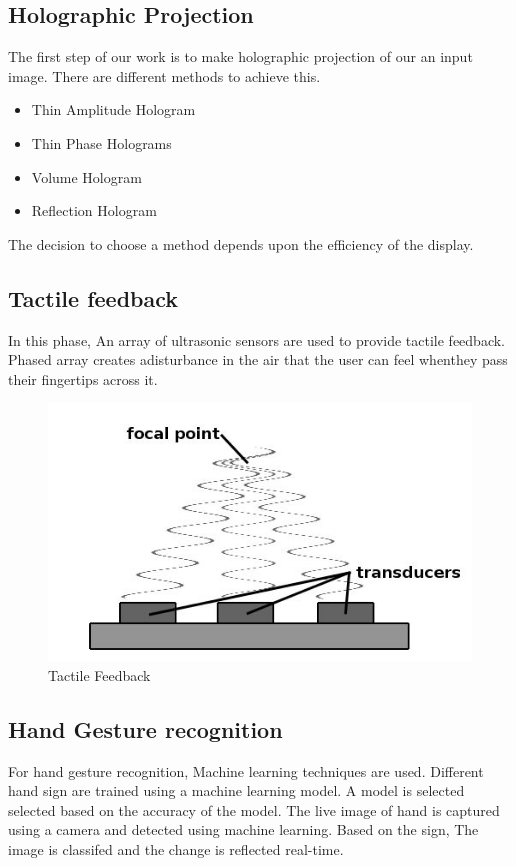 \documentclass{fisatproject}
\begin{document}
 \subsection{Holographic Projection}
    The first step of our work is to make holographic projection of our an input image.
    There are different methods to achieve this.
    \begin{itemize}
        \item Thin Amplitude Hologram
        \item Thin Phase Holograms
        \item Volume Hologram
        \item Reflection Hologram
    \end{itemize}
    The decision to choose a method depends upon the efficiency of the display.
 \subsection{Tactile feedback}
    In this phase, An array of ultrasonic sensors are used to provide tactile feedback.
    Phased array creates adisturbance in the air that the user can feel whenthey pass their fingertips across it.
    \begin{figure}[h!]
        \begin{center}
        \includegraphics[scale=.8]{images/img1.jpg}
        \caption{Tactile Feedback}
        \end{center}
        \end{figure}
 \subsection{Hand Gesture recognition}
     For hand gesture recognition, Machine learning techniques are used.
     Different hand sign are trained using a machine learning model.
     A model is selected selected based on the accuracy of the model.
     The live image of hand is captured using a camera and detected using machine learning.
     Based on the sign, The image is classifed and the change is reflected real-time.
\end{document}
